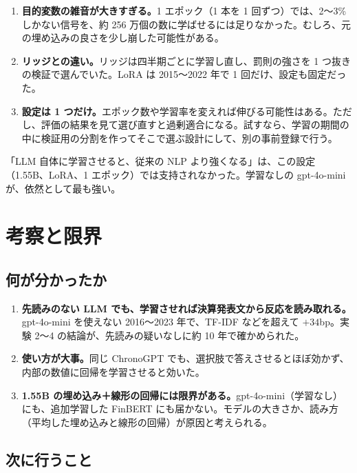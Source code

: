 \documentclass[xelatex,ja=standard,jafont=haranoaji,a4paper,10pt,openany]{bxjsreport}
\begin{document}
\begin{enumerate}
\item \textbf{目的変数の雑音が大きすぎる。}1 エポック（1 本を 1 回ずつ）では、2〜3\% しかない信号を、約 256 万個の数に学ばせるには足りなかった。むしろ、元の埋め込みの良さを少し崩した可能性がある。
\item \textbf{リッジとの違い。}リッジは四半期ごとに学習し直し、罰則の強さを 1 つ抜きの検証で選んでいた。LoRA は 2015〜2022 年で 1 回だけ、設定も固定だった。
\item \textbf{設定は 1 つだけ。}エポック数や学習率を変えれば伸びる可能性はある。ただし、評価の結果を見て選び直すと過剰適合になる。試すなら、学習の期間の中に検証用の分割を作ってそこで選ぶ設計にして、別の事前登録で行う。
\end{enumerate}

「LLM 自体に学習させると、従来の NLP より強くなる」は、この設定（1.55B、LoRA、1 エポック）では支持されなかった。学習なしの gpt-4o-mini が、依然として最も強い。

\chapter{考察と限界}\label{ch:discussion}

\section{何が分かったか}

\begin{enumerate}
\item \textbf{先読みのない LLM でも、学習させれば決算発表文から反応を読み取れる。}gpt-4o-mini を使えない 2016〜2023 年で、TF-IDF などを超えて $+34$bp。実験 2〜4 の結論が、先読みの疑いなしに約 10 年で確かめられた。
\item \textbf{使い方が大事。}同じ ChronoGPT でも、選択肢で答えさせるとほぼ効かず、内部の数値に回帰を学習させると効いた。
\item \textbf{1.55B の埋め込み＋線形の回帰には限界がある。}gpt-4o-mini（学習なし）にも、追加学習した FinBERT にも届かない。モデルの大きさか、読み方（平均した埋め込みと線形の回帰）が原因と考えられる。
\end{enumerate}

\section{次に行うこと}
\end{document}
